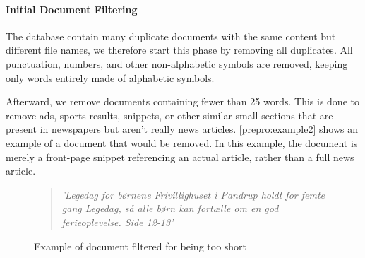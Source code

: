 \paragraph{Initial Document Filtering}
The database contain many duplicate documents with the same content but different file names, we therefore start this phase by removing all duplicates.
All punctuation, numbers, and other non-alphabetic symbols are removed, keeping only words entirely made of alphabetic symbols.

Afterward, we remove documents containing fewer than 25 words.
This is done to remove ads, sports results, snippets, or other similar small sections that are present in newspapers but aren't really news articles.
\autoref{prepro:example2} shows an example of a document that would be removed. In this example, the document is merely a front-page snippet referencing an actual article, rather than a full news article.
\begin{figure}[h]
	\begin{quote}
		\textit{
			'Legedag for børnene Frivillighuset i Pandrup holdt for femte gang Legedag, så alle børn kan fortælle om en god ferieoplevelse. Side 12-13'
		}
	\end{quote}
	\caption{Example of document filtered for being too short}
	\label{prepro:example2}
\end{figure}


